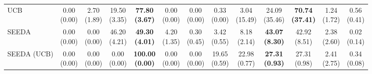 \begin{table}[H]
{\begin{tabular}{l|cccccc|cccccc}
UCB & \makecell{0.00 \\ (0.00)} & \makecell{2.70 \\ (1.89)} & {\cellcolor[HTML]{C8E6C9}} \makecell{19.50 \\ (3.35)} & \bfseries \makecell{77.80 \\ (3.67)} & \makecell{0.00 \\ (0.00)} & \makecell{0.00 \\ (0.00)} & \makecell{0.33 \\ (0.00)} & \makecell{3.04 \\ (15.49)} & {\cellcolor[HTML]{C8E6C9}} \makecell{24.09 \\ (35.46)} & \bfseries \makecell{70.74 \\ (37.41)} & \makecell{1.24 \\ (1.72)} & \makecell{0.56 \\ (0.41)} \\
SEEDA & \makecell{0.00 \\ (0.00)} & \makecell{0.00 \\ (0.00)} & {\cellcolor[HTML]{C8E6C9}} \makecell{46.20 \\ (4.21)} & \bfseries \makecell{49.30 \\ (4.01)} & \makecell{4.20 \\ (1.35)} & \makecell{0.30 \\ (0.45)} & \makecell{3.42 \\ (0.55)} & \makecell{8.18 \\ (2.14)} & {\cellcolor[HTML]{C8E6C9}} \bfseries \makecell{43.07 \\ (8.30)} & \makecell{42.92 \\ (8.51)} & \makecell{2.38 \\ (2.60)} & \makecell{0.02 \\ (0.14)} \\
SEEDA (UCB) & \makecell{0.00 \\ (0.00)} & \makecell{0.00 \\ (0.00)} & {\cellcolor[HTML]{C8E6C9}} \makecell{0.00 \\ (0.00)} & \bfseries \makecell{100.00 \\ (0.00)} & \makecell{0.00 \\ (0.00)} & \makecell{0.00 \\ (0.00)} & \makecell{19.65 \\ (0.59)} & \makecell{22.98 \\ (0.77)} & {\cellcolor[HTML]{C8E6C9}} \bfseries \makecell{27.31 \\ (0.93)} & \makecell{27.31 \\ (0.98)} & \makecell{2.41 \\ (2.75)} & \makecell{0.34 \\ (0.08)} \\

\end{tabular}}
\end{table}
